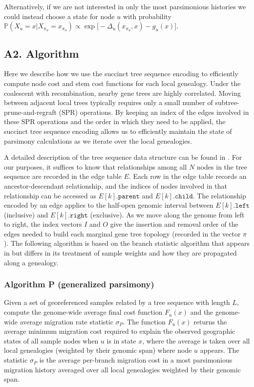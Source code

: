 Alternatively, if we are not interested in only the most parsimonious histories 
we could instead choose a state for node $u$ with probability 
$\mathbb{P}(X_u = x | X_{\pi_u} = x_{\pi_u}) \propto \exp{\bigl[-\Delta_u(x_{\pi_u}, x) - g_u(x)\bigr]}$.
\fi

\subsection*{A2. Algorithm}

Here we describe how we use the succinct tree sequence encoding
\citep{Kelleher_etal_2016} to efficiently compute node cost and stem cost 
functions for each local genealogy. Under the coalescent with recombination, 
nearby gene trees are highly correlated. Moving between adjacent local trees 
typically requires only a small number of subtree-prune-and-regraft (SPR) 
operations. By keeping an index of the edges involved in these SPR operations 
and the order in which they need to be applied, the succinct tree sequence 
encoding allows us to efficiently maintain the state of parsimony calculations 
as we iterate over the local genealogies.

A detailed description of the tree sequence data structure can be found in
\citet{Kelleher_etal_2016}. For our purposes, it suffices to know that
relationships among all $N$ nodes in the tree sequence are recorded in the edge 
table $E$. Each row in the edge table records an ancestor-descendant
relationship, and the indices of nodes involved in that relationship can be 
accessed as $E[k].\texttt{parent}$ and  $E[k].\texttt{child}$. The relationship 
encoded by an edge applies to the half-open genomic interval between $E[k].\texttt{left}$ 
(inclusive) and $E[k].\texttt{right}$ (exclusive). As we move along the genome 
from left to right, the index vectors $I$ and $O$ give the insertion and
removal order of the edges needed to build each marginal gene tree topology 
(recorded in the vector $\pi$). The following algorithm is based on
the branch statistic algorithm that appears in \citet{Ralph_etal_2020} but
differs in its treatment of sample weights and how they are propagated along
a genealogy.

\subsubsection*{Algorithm P (generalized parsimony)}

Given a set of georeferenced samples related by a tree sequence with length
$L$, compute the genome-wide average final cost function $F_u(x)$ and the
genome-wide average migration rate statistic $\sigma_P$. The function $F_u(x)$ 
returns the average minimum migration cost required to explain the observed 
geographic states of all sample nodes when $u$ is in state $x$, where the 
average is taken over all local genealogies (weighted by their genomic span)
where node $u$ appears. The statistic $\sigma_P$ is the average per-branch 
migration cost in a most parsimonious migration history averaged over all
local genealogies weighted by their genomic span.

